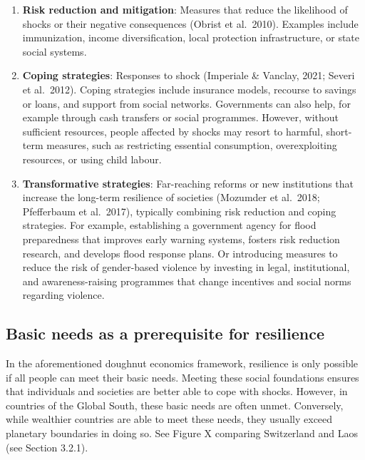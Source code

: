 \documentclass[
  a4paper,
  openany]{book}
\begin{document}
\begin{enumerate}
\def\labelenumi{\arabic{enumi}.}
\item
  \textbf{Risk reduction and mitigation}: Measures that reduce the
  likelihood of shocks or their negative consequences (Obrist et
  al.~2010). Examples include immunization, income diversification,
  local protection infrastructure, or state social systems.
\item
  \textbf{Coping strategies}: Responses to shock (Imperiale \& Vanclay,
  2021; Severi et al.~2012). Coping strategies include insurance models,
  recourse to savings or loans, and support from social networks.
  Governments can also help, for example through cash transfers or
  social programmes. However, without sufficient resources, people
  affected by shocks may resort to harmful, short-term measures, such as
  restricting essential consumption, overexploiting resources, or using
  child labour.
\item
  \textbf{Transformative strategies}: Far-reaching reforms or new
  institutions that increase the long-term resilience of societies
  (Mozumder et al.~2018; Pfefferbaum et al.~2017), typically combining
  risk reduction and coping strategies. For example, establishing a
  government agency for flood preparedness that improves early warning
  systems, fosters risk reduction research, and develops flood response
  plans. Or introducing measures to reduce the risk of gender-based
  violence by investing in legal, institutional, and awareness-raising
  programmes that change incentives and social norms regarding violence.
\end{enumerate}

\subsection{Basic needs as a prerequisite for
resilience}\label{basic-needs-as-a-prerequisite-for-resilience}

In the aforementioned doughnut economics framework, resilience is only
possible if all people can meet their basic needs. Meeting these social
foundations ensures that individuals and societies are better able to
cope with shocks. However, in countries of the Global South, these basic
needs are often unmet. Conversely, while wealthier countries are able to
meet these needs, they usually exceed planetary boundaries in doing so.
See Figure X comparing Switzerland and Laos (see Section 3.2.1).
\end{document}
